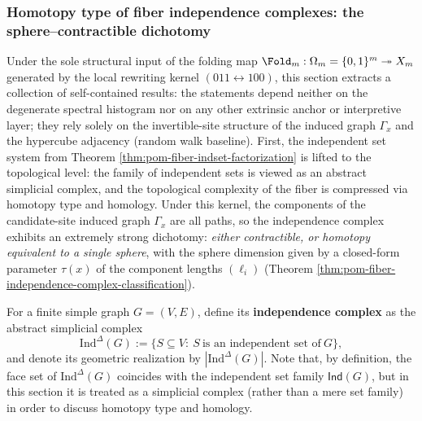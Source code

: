 %

\subsubsection{Homotopy type of fiber independence complexes: the sphere--contractible dichotomy}\label{subsubsec:pom-fiber-indcomplex}

Under the sole structural input of the folding map \(\Fold_m:\Omega_m=\{0,1\}^m\twoheadrightarrow X_m\) generated by the local rewriting kernel \((011\leftrightarrow 100)\), this section extracts a collection of self-contained results:
the statements depend neither on the degenerate spectral histogram nor on any other extrinsic anchor or interpretive layer; they rely solely on the invertible-site structure of the induced graph \(\Gamma_x\) and the hypercube adjacency (random walk baseline).
First, the independent set system from Theorem \ref{thm:pom-fiber-indset-factorization} is lifted to the topological level: the family of independent sets is viewed as an abstract simplicial complex, and the topological complexity of the fiber is compressed via homotopy type and homology.
Under this kernel, the components of the candidate-site induced graph \(\Gamma_x\) are all paths, so the independence complex exhibits an extremely strong dichotomy: \emph{either contractible, or homotopy equivalent to a single sphere},
with the sphere dimension given by a closed-form parameter \(\tau(x)\) of the component lengths \((\ell_i)\) (Theorem \ref{thm:pom-fiber-independence-complex-classification}).

\begin{definition}\label{def:pom-independence-complex}
For a finite simple graph \(G=(V,E)\), define its \textbf{independence complex} as the abstract simplicial complex
\[
\mathrm{Ind}^{\Delta}(G):=\{S\subseteq V:\ S\ \text{is an independent set of}\ G\},
\]
and denote its geometric realization by \(|\mathrm{Ind}^{\Delta}(G)|\).
Note that, by definition, the face set of \(\mathrm{Ind}^{\Delta}(G)\) coincides with the independent set family \(\mathsf{Ind}(G)\),
but in this section it is treated as a simplicial complex (rather than a mere set family) in order to discuss homotopy type and homology.
\end{definition}

